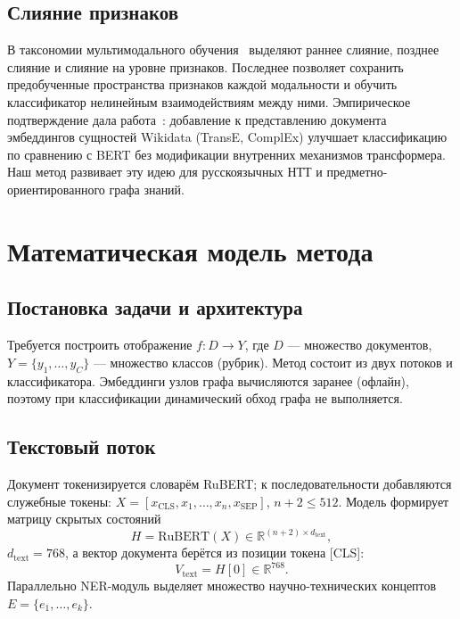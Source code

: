 \documentclass{misisarticle}
\begin{document}
\subsection{Слияние признаков}
В таксономии мультимодального обучения~\cite{multimodal} выделяют раннее слияние, позднее слияние и слияние на уровне признаков. Последнее позволяет сохранить предобученные пространства признаков каждой модальности и обучить классификатор нелинейным взаимодействиям между ними. Эмпирическое подтверждение дала работа~\cite{ostendorff}: добавление к представлению документа эмбеддингов сущностей Wikidata (TransE, ComplEx) улучшает классификацию по сравнению с BERT без модификации внутренних механизмов трансформера. Наш метод развивает эту идею для русскоязычных НТТ и предметно-ориентированного графа знаний.

\section{Математическая модель метода}
\subsection{Постановка задачи и архитектура}
Требуется построить отображение $f: D\to Y$, где $D$ --- множество документов, $Y=\{y_1,\dots,y_C\}$ --- множество классов (рубрик). Метод состоит из двух потоков и классификатора. Эмбеддинги узлов графа вычисляются заранее (офлайн), поэтому при классификации динамический обход графа не выполняется.

\subsection{Текстовый поток}
Документ токенизируется словарём RuBERT; к последовательности добавляются служебные токены: $X=[x_{\mathrm{CLS}},x_1,\dots,x_n,x_{\mathrm{SEP}}]$, $n+2\le 512$. Модель формирует матрицу скрытых состояний
\begin{equation}
H=\mathrm{RuBERT}(X)\in\mathbb{R}^{(n+2)\times d_{\mathrm{text}}},
\end{equation}
$d_{\mathrm{text}}=768$, а вектор документа берётся из позиции токена [CLS]:
\begin{equation}
V_{\mathrm{text}}=H[0]\in\mathbb{R}^{768}.
\end{equation}
Параллельно NER-модуль выделяет множество научно-технических концептов $E=\{e_1,\dots,e_k\}$.
\end{document}
